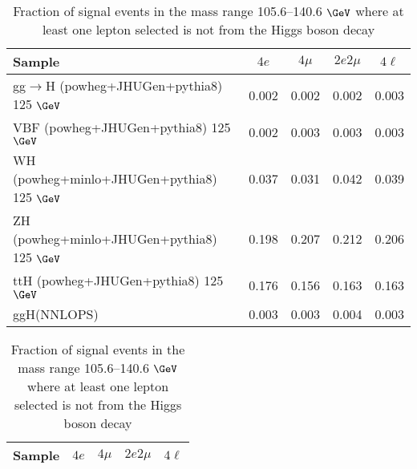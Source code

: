 \documentclass{article}
\begin{document}
 
 
\begin{table}[!h!tb]
\begin{center}
\small
\caption{
Fraction of signal events in the mass range 105.6--140.6 $\GeV$ where at least one lepton selected is not from the Higgs boson decay
\label{tab:wrongracSM}
}
\begin{tabular}{|l|c|c|c|c|} \hline 
Sample & $4e$ & $4\mu$ & $2e2\mu$ & $4\ell$ \\ \hline 
gg$\rightarrow$H ({\sc powheg+JHUGen+pythia8}) 125 $\GeV$ & 0.002 & 0.002 & 0.002 & 0.003 \\ 
VBF ({\sc powheg+JHUGen+pythia8}) 125 $\GeV$ & 0.002 & 0.003 & 0.003 & 0.003 \\ 
WH ({\sc powheg+minlo+JHUGen+pythia8}) 125 $\GeV$ & 0.037 & 0.031 & 0.042 & 0.039 \\ 
ZH ({\sc powheg+minlo+JHUGen+pythia8}) 125 $\GeV$ & 0.198 & 0.207 & 0.212 & 0.206 \\ 
ttH ({\sc powheg+JHUGen+pythia8}) 125 $\GeV$ & 0.176 & 0.156 & 0.163 & 0.163 \\ 
ggH(NNLOPS) & 0.003 & 0.003 & 0.004 & 0.003 \\ 

\hline
\end{tabular}
\normalsize
\end{center}
\end{table}
 
 
 
\begin{table}[!h!tb]
\begin{center}
\small
\caption{
Fraction of signal events in the mass range 105.6--140.6 $\GeV$ where at least one lepton selected is not from the Higgs boson decay
\label{tab:wrongfracExo}
}
\begin{tabular}{|l|c|c|c|c|} \hline 
Sample & $4e$ & $4\mu$ & $2e2\mu$ & $4\ell$ \\ \hline 

\hline
\end{tabular}
\normalsize
\end{center}
\end{table}
 
 
 
\end{document}
